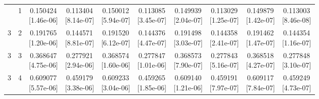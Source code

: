 \documentclass[12pt,letterpaper]{article}
\theoremstyle{plain}
\theoremstyle{definition}
\begin{document}
\begin{table}[p]
\begin{adjustbox}{max width=\linewidth}
\begin{tabular}{@{}rr*{8}{c}@{}}
\addlinespace[2pt]
3 & 1 & \shortstack{0.150424\\[-1pt]{\scriptsize[1.46e-06]}} & \shortstack{0.113404\\[-1pt]{\scriptsize[8.14e-07]}} & \shortstack{0.150012\\[-1pt]{\scriptsize[5.94e-07]}} & \shortstack{0.113085\\[-1pt]{\scriptsize[3.45e-07]}} & \shortstack{0.149939\\[-1pt]{\scriptsize[2.04e-07]}} & \shortstack{0.113029\\[-1pt]{\scriptsize[1.25e-07]}} & \shortstack{0.149879\\[-1pt]{\scriptsize[1.42e-07]}} & \shortstack{0.113003\\[-1pt]{\scriptsize[8.46e-08]}}\\
3 & 2 & \shortstack{0.191765\\[-1pt]{\scriptsize[1.20e-06]}} & \shortstack{0.144571\\[-1pt]{\scriptsize[8.81e-07]}} & \shortstack{0.191520\\[-1pt]{\scriptsize[6.12e-07]}} & \shortstack{0.144376\\[-1pt]{\scriptsize[4.47e-07]}} & \shortstack{0.191498\\[-1pt]{\scriptsize[3.03e-07]}} & \shortstack{0.144358\\[-1pt]{\scriptsize[2.41e-07]}} & \shortstack{0.191462\\[-1pt]{\scriptsize[1.47e-07]}} & \shortstack{0.144354\\[-1pt]{\scriptsize[1.16e-07]}}\\
3 & 3 & \shortstack{0.368647\\[-1pt]{\scriptsize[4.75e-06]}} & \shortstack{0.277921\\[-1pt]{\scriptsize[2.94e-06]}} & \shortstack{0.368574\\[-1pt]{\scriptsize[1.60e-06]}} & \shortstack{0.277847\\[-1pt]{\scriptsize[1.01e-06]}} & \shortstack{0.368573\\[-1pt]{\scriptsize[7.90e-07]}} & \shortstack{0.277843\\[-1pt]{\scriptsize[5.16e-07]}} & \shortstack{0.368518\\[-1pt]{\scriptsize[4.27e-07]}} & \shortstack{0.277848\\[-1pt]{\scriptsize[3.10e-07]}}\\
3 & 4 & \shortstack{0.609077\\[-1pt]{\scriptsize[5.57e-06]}} & \shortstack{0.459179\\[-1pt]{\scriptsize[3.38e-06]}} & \shortstack{0.609233\\[-1pt]{\scriptsize[3.04e-06]}} & \shortstack{0.459265\\[-1pt]{\scriptsize[1.85e-06]}} & \shortstack{0.609140\\[-1pt]{\scriptsize[1.21e-06]}} & \shortstack{0.459191\\[-1pt]{\scriptsize[7.97e-07]}} & \shortstack{0.609117\\[-1pt]{\scriptsize[7.84e-07]}} & \shortstack{0.459249\\[-1pt]{\scriptsize[4.73e-07]}}\\

\end{tabular}
\end{adjustbox}
\end{table}
\end{document}
